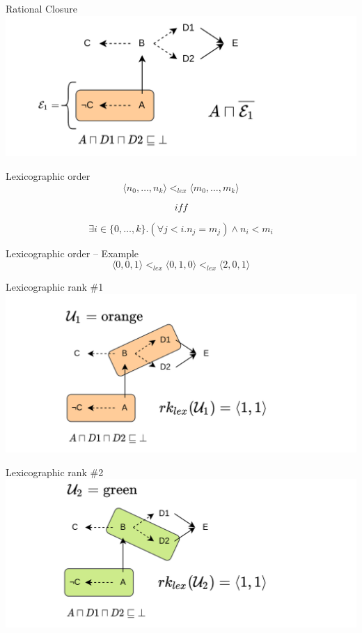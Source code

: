 \documentclass[10pt]{beamer}
\begin{document}
\begin{frame}[fragile]{Rational Closure}
  \includegraphics[scale=.3]{img/rationalc.png}
\end{frame}

\begin{frame}[fragile]{Lexicographic order}
\Large
$$\langle n_0, \dots, n_k \rangle <_{lex} \langle m_0, \dots, m_k \rangle$$

$$\textit{iff}$$

$$\exists i \in \{0, \dots, k\}.(\forall j < i.n_j = m_j) \land n_i < m_i$$
\end{frame}

\begin{frame}[fragile]{Lexicographic order -- Example}
  \Large
$$\langle 0, 0, 1 \rangle <_{lex} \langle 0, 1, 0 \rangle <_{lex} \langle 2, 0, 1 \rangle$$
\end{frame}

\begin{frame}[fragile]{Lexicographic rank \#1}
  \includegraphics[scale=.27]{img/rklex1.png}
\end{frame}

\begin{frame}[fragile]{Lexicographic rank \#2}
  \includegraphics[scale=.27]{img/rklex2.png}
\end{frame}
\end{document}
